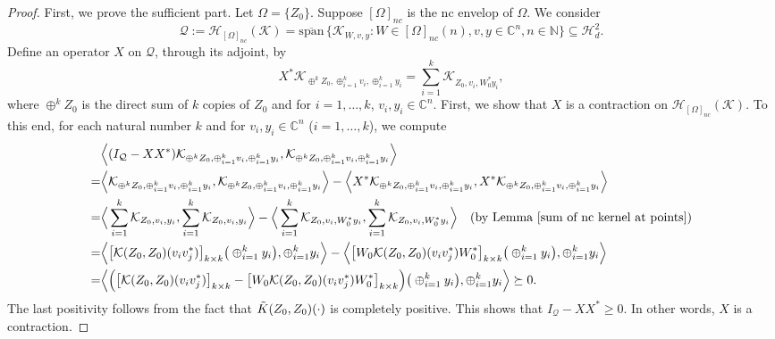 \documentclass[12pt]{amsart}%
\numberwithin{equation}{section}
\newcommand{\clh}{\mathcal{H}}
\newcommand{\clk}{\mathcal{K}}
\newcommand{\clq}{\mathcal{Q}}
\newcommand{\C}{\mathbb{C}}
\begin{document}
\begin{proof} First, we prove the sufficient part. 
 Let $\Omega=\{Z_0\}$. Suppose $[\Omega]_{nc}$ is the nc envelop of $\Omega$. We consider 
\[\clq:=\clh_{[\Omega]_{nc}}(\clk)=\overline{\text{span}}\,\{ \clk_{W, v, y}: W\in [\Omega]_{nc}(n), v, y\in \C^n, n\in \mathbb{N}\}\subseteq \clh^2_d.\]
Define an operator $X$ on $\clq$, through its adjoint, by 
\[
X^*\clk_{\oplus^k Z_0, \oplus_{i=1}^k v_i, \oplus_{i=1}^k y_i}=\sum_{i=1}^k\clk_{Z_0, v_i, W^*_0 y_i},
\]
where $\oplus^k Z_0$ is the direct sum of $k$ copies of $Z_0$ and for  $i=1, \ldots, k$,   $v_i, y_i\in \C^n$.
First, we show that $X$ is a contraction on $\clh_{[\Omega]_{nc}}(\clk)$. To this end, for each natural number $k$ and 
for $v_i, y_i\in \C^n$ ($i=1, \ldots, k$), we compute
\begingroup
 \allowdisplaybreaks
\begin{align*}
&\Big\langle (I_{\clq}-X X^*) \clk_{\oplus^k Z_0, \oplus_{i=1}^k v_i, \oplus_{i=1}^k y_i},  \clk_{\oplus^k Z_0, \oplus_{i=1}^k v_i, \oplus_{i=1}^k y_i}\Big\rangle\\
=& \Big\langle\clk_{\oplus^k Z_0, \oplus_{i=1}^k v_i, \oplus_{i=1}^k y_i},  \clk_{\oplus^k Z_0, \oplus_{i=1}^k v_i, \oplus_{i=1}^k y_i}\Big\rangle- \Big\langle X^*\clk_{\oplus^k Z_0, \oplus_{i=1}^k v_i, \oplus_{i=1}^k y_i},   X^* \clk_{\oplus^k Z_0, \oplus_{i=1}^k v_i, \oplus_{i=1}^k y_i}\Big\rangle\\
=& \Big\langle\sum_{i=1}^k\clk_{ Z_0, v_i, y_i}, \sum_{i=1}^k \clk_{ Z_0, v_i, y_i}\Big\rangle- \Big\langle \sum_{i=1}^k\clk_{Z_0, v_i, W^*_0 y_i},   \sum_{i=1}^k\clk_{Z_0, v_i, W^*_0 y_i}\Big\rangle\quad(\text{by Lemma \ref{sum of nc kernel at points}})\\
=& \Big\langle \big[\clk(Z_0, Z_0)(v_i v^*_j)\big]_{k\times k}  \big(\oplus_{i=1}^k y_i\big),  \oplus_{i=1}^k y_i\Big\rangle-  \Big\langle \big[W_0\clk(Z_0, Z_0)(v_i v^*_j)W^*_0\big]_{k\times k}  \big(\oplus_{i=1}^k y_i\big),  \oplus_{i=1}^k y_i\Big\rangle\\
=& \Big\langle\Big(\big[\clk(Z_0, Z_0)(v_i v^*_j)\big]_{k\times k} -\big[W_0\clk(Z_0, Z_0)(v_i v^*_j)W^*_0\big]_{k\times k} \Big ) \big(\oplus_{i=1}^k y_i\big),  \oplus_{i=1}^k y_i\Big\rangle\succeq0.
\end{align*}
\endgroup
The last positivity follows from the fact that $\Tilde{K}(Z_0, Z_0)(\cdot)$ is completely positive. This shows that $I_{\clq}-X X^*\geq 0$. In other words, $X$ is a contraction. 


\end{proof}
\end{document}
